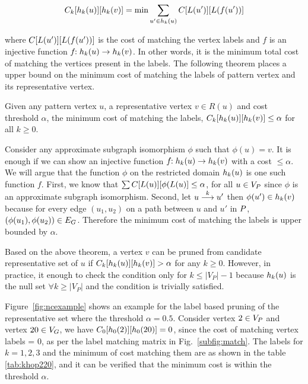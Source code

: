  \begin{equation}
  \khopcost{k}{u}{v} = \text{min}\displaystyle\sum_{u' \in \khopl{k}{u}} \matij{C}{L(u')}{L(f(u'))}
 \end{equation}

where 
$\matij{C}{L(u')}{L(f(u'))}$ is the cost of matching the vertex labels and
$f$ is an injective function $f\!\!:\khopl{k}{u} \rightarrow \khopl{k}{v}$.
In other words,
it is the minimum total cost of matching the vertices present in the \khop labels.
The following theorem places a upper bound on the minimum cost of matching
the \khop labels of pattern vertex and its representative vertex.

\begin{thm}
Given any pattern vertex $u$, a representative vertex $v \in R(u)$ and cost
threshold $\alpha$, the minimum cost of matching the \khop labels, 
$\khopcost{k}{u}{v} \leq \alpha$ for all $k \geq 0$.

\begin{myproof}
Consider any approximate subgraph isomorphism $\phi$
such that $\phi(u) = v$. It is enough if we can show an injective function
$f\!\!:\khopl{k}{u} \rightarrow \khopl{k}{v}$ with a cost
$\leq \alpha$. We will argue that the function $\phi$ on the restricted domain
$\khopl{k}{u}$ is one such function $f$.
First, we know that 
$\sum\matij{C}{L(u)}{\phi(L(u)} \leq \alpha$, for all $u \in \vp$ since
$\phi$ is an approximate subgraph isomorphism. Second, let 
$\kpath{u}{u'}{k}$
then $\phi(u') \in \khopl{k}{v}$ because for every edge $(u_1, u_2)$ on a 
path between $u$ and $u'$ in $\pat$, $(\phi(u_1),\phi(u_2)) \in \eg$. 
Therefore the minimum cost of matching the \khop labels is upper bounded
by $\alpha$.
\end{myproof}
\label{thm:khop}
\end{thm}

Based on the above theorem, a vertex $v$ can be pruned from candidate
representative set of $u$ if $\khopcost{k}{u}{v} > \alpha$ for any 
$k \geq 0$. However, in practice, it enough to check the condition only
for $k \leq |V_P|-1$ because $\khopl{k}{u}$ is the null set $\forall k \geq
|V_P|$ and the condition is trivially satisfied.

Figure~\ref{fig:ncexample} shows an example for the \khop label based
pruning of the representative set where the
threshold $\alpha = 0.5$. Consider vertex $2 \in \vp$ and vertex
$20 \in \vg$, we have 
$\khopcost{0}{2}{20} = 0$, since the cost of matching vertex labels 
 = 0, 
as per the label matching matrix
 in Fig.~\ref{subfig:match}. The \khop labels for $k=1,2,3$ and 
the minimum of cost matching them are
as shown in the table \ref{tab:khop220}, and it can be verified that
the minimum cost is within the threshold $\alpha$.

